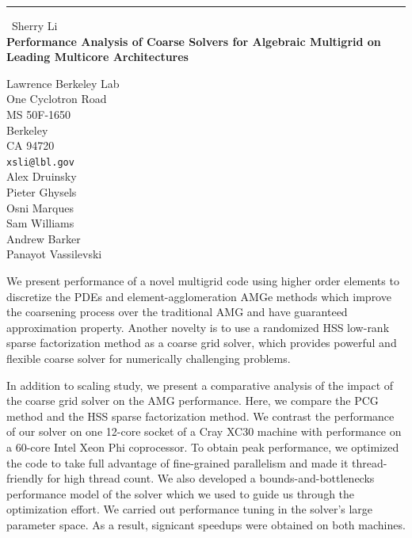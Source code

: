 \documentclass{report}
\begin{document}
\begin{center}
\rule{6in}{1pt} \
{\large Sherry Li \\
{\bf Performance Analysis of Coarse Solvers for Algebraic Multigrid on Leading Multicore Architectures}}

Lawrence Berkeley Lab \\ One Cyclotron Road \\ MS 50F-1650 \\ Berkeley \\ CA 94720
\\
{\tt xsli@lbl.gov}\\
Alex Druinsky\\
Pieter Ghysels\\
Osni Marques\\
Sam Williams\\
Andrew Barker\\
Panayot Vassilevski\end{center}

We present performance of a novel multigrid code using higher order elements to
discretize the PDEs and element-agglomeration AMGe methods which
improve the coarsening process over the traditional AMG and have guaranteed
approximation property. Another novelty is to use a randomized HSS
low-rank sparse factorization method as a coarse grid solver,
which provides powerful and flexible coarse solver for numerically
challenging problems.

In addition to scaling study, we present a comparative analysis of the impact
of the coarse grid solver on the AMG performance. Here, we compare the
PCG method and the HSS sparse factorization method.
We contrast the performance of our solver on one 12-core socket of
a Cray XC30 machine with performance on a 60-core Intel Xeon Phi coprocessor.
To obtain peak performance, we optimized the code to take full advantage
of fine-grained parallelism and made it thread-friendly for high thread count.
We also developed a bounds-and-bottlenecks performance model of the solver
which we used to guide us through the optimization effort. We carried out
performance tuning in the solver's large parameter space. As a result,
signicant speedups were obtained on both machines.
\end{document}

